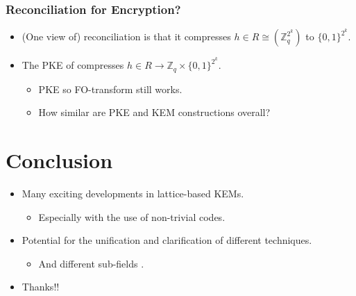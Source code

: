\documentclass{beamer}
\theoremstyle{definition}
\begin{document}
\begin{frame}
	\frametitle{Reconciliation for Encryption?}
	\begin{itemize}
		\item (One view of) \alert{reconciliation} is that it compresses $h\in R \cong (\mathbb{Z}_q^{2^k})$ to $\{0,1\}^{2^k}$.\pause
		\item The \alert{PKE} of \cite{TCC:BDGM19} compresses $h\in R\to \mathbb{Z}_q \times\{0,1\}^{2^k}$.\pause
		\begin{itemize}
			\item \alert{PKE} so FO-transform still works.\pause
			\item How similar are \alert{PKE} and \alert{KEM} constructions overall?
		\end{itemize}
	\end{itemize}
\end{frame}

\section{Conclusion}

{
	\begin{frame}
	\begin{itemize}
		\item Many exciting developments in lattice-based KEMs.\pause
		\begin{itemize}
			\item Especially with the use of \alert{non-trivial} codes.\pause
		\end{itemize}
	\item Potential for the \alert{unification} and \alert{clarification} of different techniques.\pause
	\begin{itemize}
		\item And different sub-fields \cite{cryptofromlinalg}.\pause
	\end{itemize}
	\item Thanks!!
	\end{itemize}
	\end{frame}
}
	\printbibliography
\end{document}
